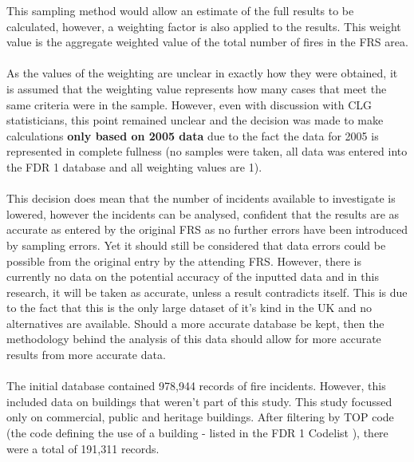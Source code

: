 \documentclass[table,a4paper,oneside]{book}
\begin{document}
This sampling method would allow an estimate of the full results to be calculated, however, a weighting factor is also applied to the results. This weight value is the aggregate weighted value of the total number of fires in the \ac{FRS} area.
\\
\\
As the values of the weighting are unclear in exactly how they were obtained, it is assumed that the weighting value represents how many cases that meet the same criteria were in the sample. However, even with discussion with CLG statisticians, this point remained unclear and the decision was made to make calculations \textbf{only based on 2005 data} due to the fact the data for 2005 is represented in complete fullness (no samples were taken, all data was entered into the FDR 1 database and all weighting values are 1).
\\
\\
This decision does mean that the number of incidents available to investigate is lowered, however the incidents can be analysed, confident that the results are as accurate as entered by the original FRS as no further errors have been introduced by sampling errors. Yet it should still be considered that data errors could be possible from the original entry by the attending \ac{FRS}. However, there is currently no data on the potential accuracy of the inputted data and in this research, it will be taken as accurate, unless a result contradicts itself. This is due to the fact that this is the only large dataset of it's kind in the UK and no alternatives are available. Should a more accurate database be kept, then the methodology behind the analysis of this data should allow for more accurate results from more accurate data.
\\
\\
The initial database contained 978,944 records of fire incidents. However, this included data on buildings that weren't part of this study. This study focussed only on commercial, public and heritage buildings. After filtering by TOP code (the code defining the use of a building - listed in the FDR 1 Codelist \citep{HomeOfficeResearchDevelopment&StatisticsDirectorate1998}), there were a total of 191,311 records.


\end{document}

